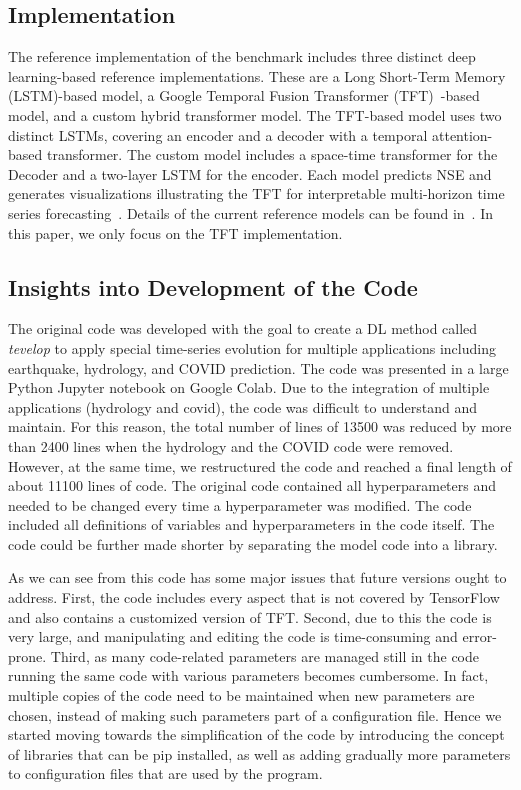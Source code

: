 \documentclass[utf8]{FrontiersinVancouver} %
\begin{document}
{\subsection{Implementation}

The reference implementation of the benchmark includes three distinct
deep learning-based reference implementations. These are a Long
Short-Term Memory (LSTM)-based model, a Google Temporal Fusion
Transformer (TFT)~\citep{TFT-21}-based model, and a custom hybrid
transformer model. The TFT-based model uses two distinct LSTMs,
covering an encoder and a decoder with a temporal attention-based
transformer. The custom model includes a space-time transformer for
the Decoder and a two-layer LSTM for the encoder. Each model predicts
NSE and generates visualizations illustrating the TFT for
interpretable multi-horizon time series
forecasting~\citep{TFT-21}. Details of the current reference models
can be found in~\citep{fox2022-jm}.  In this paper, we only focus on
the TFT implementation.

\subsection{Insights into Development of the Code}

The original code was developed with the goal to create a DL method
called {\em tevelop} to apply special time-series evolution for
multiple applications including earthquake, hydrology, and COVID
prediction. The code was presented in a large Python Jupyter notebook
on Google Colab.  Due to the integration of multiple applications
(hydrology and covid), the code was difficult to understand and
maintain. For this reason, the total number of lines of 13500 was
reduced by more than 2400 lines when the hydrology and the COVID code
were removed. However, at the same time, we restructured the code and
reached a final length of about 11100 lines of code. The original code
contained all hyperparameters and needed to be changed every time a
hyperparameter was modified. The code included all definitions of
variables and hyperparameters in the code itself. The code could be
further made shorter by separating the model code into a library.

As we can see from this code has some major issues that future
versions ought to address. First, the code includes every aspect that
is not covered by TensorFlow and also contains a customized version of
TFT. Second, due to this the code is very large, and manipulating and
editing the code is time-consuming and error-prone. Third, as many
code-related parameters are managed still in the code running the same
code with various parameters becomes cumbersome. In fact, multiple
copies of the code need to be maintained when new parameters are
chosen, instead of making such parameters part of a configuration
file. Hence we started moving towards the simplification of the code
by introducing the concept of libraries that can be pip installed, as
well as adding gradually more parameters to configuration files that
are used by the program.

}
\end{document}
